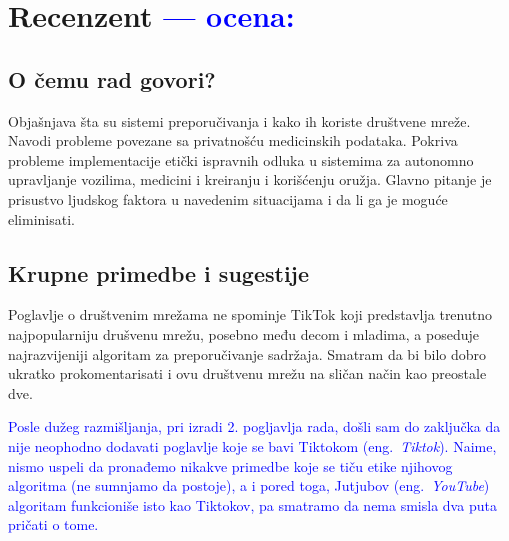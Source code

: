 \documentclass[a4paper]{report}
\newcommand{\odgovor}[1]{\textcolor{blue}{#1}}
\begin{document}
\chapter{Recenzent \odgovor{--- ocena:} }


\section{O čemu rad govori?}
Objašnjava šta su sistemi preporučivanja i kako ih koriste društvene mreže. Navodi probleme povezane sa privatnošću medicinskih  podataka. Pokriva probleme implementacije etički ispravnih odluka u sistemima za autonomno upravljanje vozilima, medicini i kreiranju i korišćenju oružja. Glavno pitanje je prisustvo ljudskog faktora u navedenim situacijama i da li ga je moguće eliminisati.

\section{Krupne primedbe i sugestije}
Poglavlje o društvenim mrežama ne spominje TikTok koji predstavlja trenutno najpopularniju drušvenu mrežu, posebno među decom i mladima, a poseduje najrazvijeniji algoritam za preporučivanje sadržaja. Smatram da bi bilo dobro ukratko prokomentarisati i ovu društvenu mrežu na sličan način kao preostale dve. 

\odgovor{Posle dužeg razmišljanja, pri izradi 2. pogljavlja rada, došli sam do zaključka da nije neophodno dodavati poglavlje koje se bavi Tiktokom (eng.~{\em Tiktok}). Naime, nismo uspeli da pronađemo nikakve primedbe koje se tiču etike njihovog algoritma (ne sumnjamo da postoje), a i pored toga, Jutjubov (eng.~{\em YouTube}) algoritam funkcioniše isto kao Tiktokov, pa smatramo da nema smisla dva puta pričati o tome.}
\end{document}
